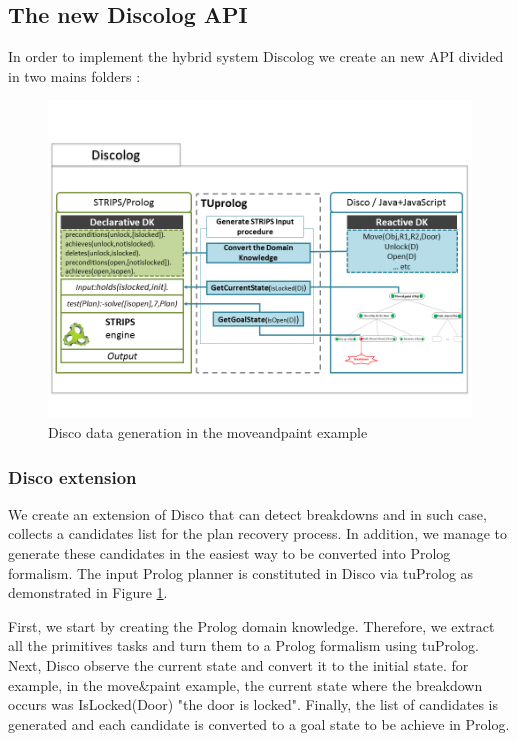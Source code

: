\subsection{The new Discolog API}
In order to implement the hybrid system Discolog we create an new  API divided in two mains folders :
	\begin{figure}[!h]
		\centering
		\includegraphics[width=\textwidth]{Pictures/input1.png}
		\caption{\label{input} Disco data generation in the moveandpaint example}
	\end{figure}
	
\subsubsection{ Disco extension }
We create an extension of Disco that can detect breakdowns and in such case, collects a candidates list for the plan recovery process. In addition, we manage to generate these candidates in the easiest way to be converted into Prolog formalism. The input Prolog planner is constituted in Disco via tuProlog as demonstrated in Figure \ref{input}.


 First, we start by creating the Prolog domain knowledge. Therefore, we extract all the primitives tasks and turn them to a Prolog formalism using tuProlog. Next, Disco observe the current state and convert it to the initial state. for example, in the move\&paint example, the current state where the breakdown occurs was IsLocked(Door) "the door is locked". Finally, the list of candidates is generated and each candidate is converted to a goal state to be achieve in Prolog.


